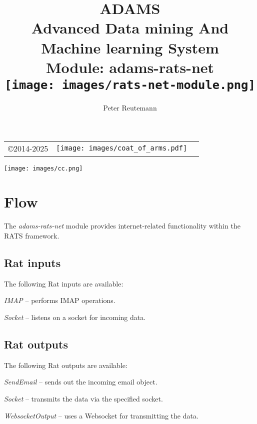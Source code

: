 \documentclass[a4paper]{book}
\title{
  \textbf{ADAMS} \\
  {\Large \textbf{A}dvanced \textbf{D}ata mining \textbf{A}nd \textbf{M}achine
  learning \textbf{S}ystem} \\
  {\Large Module: adams-rats-net} \\
  \vspace{1cm}
  \texttt{[image: images/rats-net-module.png]} \\
}
\author{
  Peter Reutemann
}
\begin{document}
\begin{titlepage}
\maketitle

\thispagestyle{empty}
\center
\begin{table}[b]
	\begin{tabular}{c l l}
		\parbox[c][2cm]{2cm}{\copyright 2014-2025} &
		\parbox[c][2cm]{5cm}{\texttt{[image: images/coat\_of\_arms.pdf]}}
	\end{tabular}
	\texttt{[image: images/cc.png]} \\
\end{table}

\end{titlepage}

\tableofcontents

\chapter{Flow}

The \textit{adams-rats-net} module provides internet-related functionality
within the RATS framework.

\section{Rat inputs}
The following Rat inputs are available:
\begin{tight_itemize}
  \item \textit{IMAP} -- performs IMAP operations.
  \item \textit{Socket} -- listens on a socket for incoming data.
\end{tight_itemize}

\section{Rat outputs}
The following Rat outputs are available:
\begin{tight_itemize}
  \item \textit{SendEmail} -- sends out the incoming email object.
  \item \textit{Socket} -- transmits the data via the specified socket.
  \item \textit{WebsocketOutput} -- uses a Websocket\cite{websocket} for transmitting the data.
\end{tight_itemize}


\end{document}
